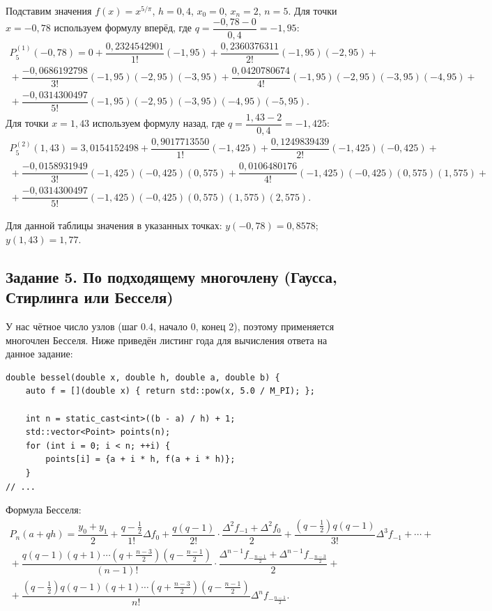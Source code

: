 \documentclass[14pt,a4paper]{extarticle}
\begin{document}
	\noindent Подставим значения $f(x)=x^{5/\pi}$, $h=0{,}4$, $x_0=0$, $x_n=2$, $n=5$. Для точки $x=-0{,}78$ используем формулу вперёд, где $q=\dfrac{-0{,}78-0}{0{,}4}=-1{,}95$:
	\begingroup\small
	\begin{multline*}
		P_5^{(1)}(-0{,}78)=0+
		\dfrac{0{,}2324542901}{1!}(-1{,}95)
		+\dfrac{0{,}2360376311}{2!}(-1{,}95)(-2{,}95)+{}\\
		{}+\dfrac{-0{,}0686192798}{3!}(-1{,}95)(-2{,}95)(-3{,}95)
		+\dfrac{0{,}0420780674}{4!}(-1{,}95)(-2{,}95)(-3{,}95)(-4{,}95)+{}\\
		{}+\dfrac{-0{,}0314300497}{5!}(-1{,}95)(-2{,}95)(-3{,}95)(-4{,}95)(-5{,}95).
	\end{multline*}
	\endgroup
	Для точки $x=1{,}43$ используем формулу назад, где $q=\dfrac{1{,}43-2}{0{,}4}=-1{,}425$:
	\begingroup\small
	\begin{multline*}
		P_5^{(2)}(1{,}43)=3{,}0154152498+
		\dfrac{0{,}9017713550}{1!}(-1{,}425)
		+\dfrac{0{,}1249839439}{2!}(-1{,}425)(-0{,}425)+{}\\
		{}+\dfrac{-0{,}0158931949}{3!}(-1{,}425)(-0{,}425)(0{,}575)
		+\dfrac{0{,}0106480176}{4!}(-1{,}425)(-0{,}425)(0{,}575)(1{,}575)+{}\\
		{}+\dfrac{-0{,}0314300497}{5!}(-1{,}425)(-0{,}425)(0{,}575)(1{,}575)(2{,}575).
	\end{multline*}
	\endgroup
	
	Для данной таблицы значения в указанных точках: $y(-0,78) = 0,8578$; $y(1,43) = 1,77$.
	
	\subsection{Задание 5. По подходящему многочлену (Гаусса, Стирлинга или Бесселя)}
	У нас чётное число узлов (шаг 0.4, начало 0, конец 2), поэтому применяется многочлен Бесселя. Ниже приведён листинг года для вычисления ответа на данное задание:
	
	\begin{lstlisting}
double bessel(double x, double h, double a, double b) {
	auto f = [](double x) { return std::pow(x, 5.0 / M_PI); };
	
	int n = static_cast<int>((b - a) / h) + 1;
	std::vector<Point> points(n);
	for (int i = 0; i < n; ++i) {
		points[i] = {a + i * h, f(a + i * h)};
	}
// ...
	\end{lstlisting}
	
	\noindent Формула Бесселя:
	\begingroup\small
	\begin{multline*}
		P_n(a+qh)=\dfrac{y_0+y_1}{2}
		+\dfrac{q-\frac{1}{2}}{1!}\Delta f_0
		+\dfrac{q(q-1)}{2!}\cdot\dfrac{\Delta^2 f_{-1}+\Delta^2 f_0}{2}
		+\dfrac{(q-\frac{1}{2})q(q-1)}{3!}\Delta^3 f_{-1}
		+\cdots+{}\\
		{}+\dfrac{q(q-1)(q+1)\cdots\left(q+\frac{n-3}{2}\right)\left(q-\frac{n-1}{2}\right)}{(n-1)!}
		\cdot\dfrac{\Delta^{n-1}f_{-\frac{n-1}{2}}+\Delta^{n-1}f_{-\frac{n-3}{2}}}{2}
		+{}\\
		{}+\dfrac{(q-\frac{1}{2})q(q-1)(q+1)\cdots\left(q+\frac{n-3}{2}\right)\left(q-\frac{n-1}{2}\right)}{n!}
		\Delta^n f_{-\frac{n-1}{2}}.
	\end{multline*}
	\endgroup
	
\end{document}

